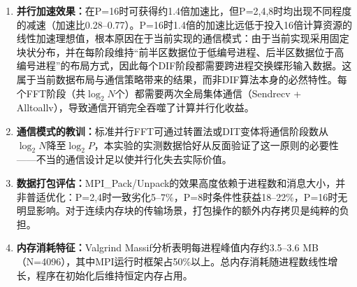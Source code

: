 \documentclass{SYSUReport}
\begin{document}
\begin{enumerate}
    \item \textbf{并行加速效果：}在P=16时可获得约1.4倍加速比，但P=2,4,8时均出现不同程度的减速（加速比0.28--0.77）。P=16时1.4倍的加速比远低于投入16倍计算资源的线性加速理想值，根本原因在于当前实现的通信模式：由于当前实现采用固定块状分布，并在每阶段维持“前半区数据位于低编号进程、后半区数据位于高编号进程”的布局方式，因此每个DIF阶段都需要跨进程交换蝶形输入数据。这属于当前数据布局与通信策略带来的结果，而非DIF算法本身的必然特性。每个FFT阶段（共$\log_2 N$个）都需要两次全局集体通信（Sendrecv + Alltoallv），导致通信开销完全吞噬了计算并行化收益。
    \item \textbf{通信模式的教训：}标准并行FFT可通过转置法或DIT变体将通信阶段数从$\log_2 N$降至$\log_2 P$，本实验的实测数据恰好从反面验证了这一原则的必要性——不当的通信设计足以使并行化失去实际价值。
    \item \textbf{数据打包评估：}MPI\_Pack/Unpack的效果高度依赖于进程数和消息大小，并非普适优化：P=2,4时一致劣化5--7\%，P=8时条件性获益18--22\%，P=16时无明显影响。对于连续内存块的传输场景，打包操作的额外内存拷贝是纯粹的负担。
    \item \textbf{内存消耗特征：}Valgrind Massif分析表明每进程峰值内存约3.5--3.6 MB（N=4096），其中MPI运行时框架占50\%以上。总内存消耗随进程数线性增长，程序在初始化后维持恒定内存占用。
\end{enumerate}
\end{document}
